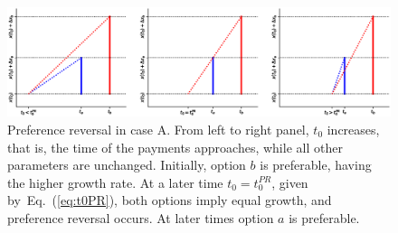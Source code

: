 \documentclass[11pt]{article}
\newcommand{\eref}[1]{Eq.~(\ref{eq:#1})}
\newcommand{\flabel}[1]{\label{fig:#1}}
\newcommand{\be}{\begin{equation}}
\newcommand{\ee}{\end{equation}}
\newcommand{\Dt}{\Delta t}
\newcommand{\Dx}{\Delta x}
\numberwithin{equation}{section}
\begin{document}
\begin{figure}[!htb]
\centering
\includegraphics[width=1.0\textwidth]{./figures/reversals.eps}
\caption{Preference reversal in case A. From left to right panel, $t_0$ increases, that is, the time of the payments approaches, while all other parameters are unchanged. Initially, option $b$ is preferable, having the higher growth rate. At a later time $t_0=t_0^{PR}$, given by~\eref{t0PR}, both options imply equal growth, and preference reversal occurs. At later times option $a$ is preferable.}
\flabel{caseA}
\end{figure}


\end{document}
